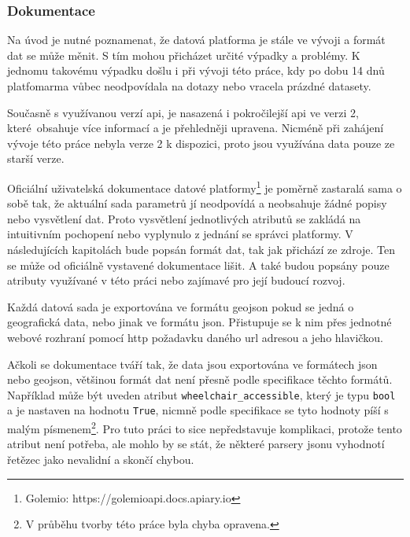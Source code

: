 \subsubsection{Dokumentace}

Na úvod je nutné poznamenat, že datová platforma je stále ve vývoji a formát dat se může měnit. S tím mohou přicházet určité výpadky a problémy. K jednomu takovému výpadku došlu i při vývoji této práce, kdy po dobu 14 dnů platfomarma vůbec neodpovídala na dotazy nebo vracela prázdné datasety.

\bigbreak

Současně s využívanou verzí \gls{api}, je nasazená i pokročilejší \gls{api} ve verzi 2, které obsahuje více informací a je přehledněji upravena. Nicméně při zahájení vývoje této práce nebyla verze 2 k dispozici, proto jsou využívána data pouze ze starší verze.

\bigbreak

Oficiální uživatelská dokumentace datové platformy\footnote{Golemio: https://golemioapi.docs.apiary.io} je poměrně zastaralá sama o sobě tak, že aktuální sada parametrů jí neodpovídá a neobsahuje žádné popisy nebo vysvětlení dat. Proto vysvětlení jednotlivých atributů se zakládá na intuitivním pochopení nebo vyplynulo z jednání se správci platformy. V následujících kapitolách bude popsán formát dat, tak jak přichází ze zdroje. Ten se může od oficiálně vystavené dokumentace lišit. A také budou popsány pouze atributy využívané v této práci nebo zajímavé pro její budoucí rozvoj.

\bigbreak

Každá datová sada je exportována ve formátu \gls{geojson} pokud se jedná o geografická data, nebo jinak ve formátu \gls{json}. Přistupuje se k nim přes jednotné webové rozhraní pomocí \gls{http} požadavku daného \gls{url} adresou a jeho hlavičkou.

\bigbreak

Ačkoli se dokumentace tváří tak, že data jsou exportována ve formátech \gls{json} nebo \gls{geojson}, většinou formát dat není přesně podle specifikace těchto formátů. Například může být uveden atribut \verb"wheelchair_accessible", který je typu \verb"bool" a je nastaven na hodnotu \verb"True", nicmně podle specifikace se tyto hodnoty píší s malým písmenem\footnote{V průběhu tvorby této práce byla chyba opravena.}. Pro tuto práci to sice nepředstavuje komplikaci, protože tento atribut není potřeba, ale mohlo by se stát, že některé parsery \gls{json}u vyhodnotí řetězec jako nevalidní a skončí chybou.

